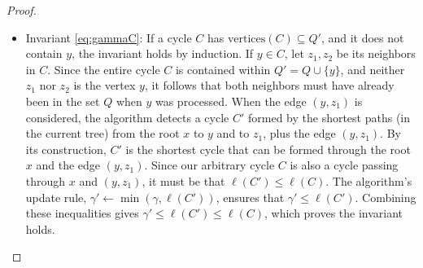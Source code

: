 \documentclass{article}
\newcommand{\ta}[1]{\textcolor{blue}{\textit{(TA: {#1})}}}
\newcommand{\hs}[1]{\textcolor{olive}{\textit{(HS: {#1})}}}
\begin{document}
\begin{proof}
\begin{itemize}
    If $y$ is a vertex in cycle $C$, let $z_1$ and $z_2$ be its neighbors within that cycle. Since the entire cycle $C$ is contained within $Q' = Q \cup \{y\}$, and neither $z_1$ nor $z_2$ is the vertex $y$, it follows that both neighbors must have already been in the set $Q$ when $y$ was processed.
    When the edge $(y, z_1)$ is considered in Line \ref{line:cycle_check}, the algorithm finds the LCA $p$ and calculates a cycle length. Let the cycle formed by the paths $x \leadsto p \leadsto y$ and $x \leadsto p \leadsto z_1$ plus edge $(y,z_1)$ be $C'$. Its length is $\delta(y) + \delta(z_1) + w(y, z_1) - 2\delta(p)$. The update rule $\gamma' \leftarrow \min(\gamma, \ell(C'))$ ensures $\gamma' \le \ell(C')$. While $C'$ might not be $C$, the argument extends to show that $\gamma$ eventually bounds the length of any cycle fully within $Q$. The explicit calculation using $\delta(y) + \delta(z) + w(y,z)$ in Line \ref{line:cycle_length_calc} of the pseudocode directly calculates the length of the cycle formed by the path $x \leadsto y$, edge $(y,z)$, and path $z \leadsto x$ found so far. The proof relates this calculation to $\ell(C)$ through the properties of shortest paths and LCAs. \ta{I didn't get the above argument}\hs{here is another attempt, but please feel free to rewrite}
    \item Invariant \eqref{eq:gammaC}: If a cycle $C$ has $\text{vertices}(C) \subseteq Q'$, and it does not contain $y$, the invariant holds by induction. If $y \in C$, let $z_1, z_2$ be its neighbors in $C$. Since the entire cycle $C$ is contained within $Q' = Q \cup \{y\}$, and neither $z_1$ nor $z_2$ is the vertex $y$, it follows that both neighbors must have already been in the set $Q$ when $y$ was processed.
    When the edge $(y, z_1)$ is considered, the algorithm detects a cycle $C'$ formed by the shortest paths (in the current tree) from the root $x$ to $y$ and to $z_1$, plus the edge $(y, z_1)$. By its construction, $C'$ is the shortest cycle that can be formed through the root $x$ and the edge $(y,z_1)$. Since our arbitrary cycle $C$ is also a cycle passing through $x$ and $(y, z_1)$, it must be that $\ell(C') \le \ell(C)$.
    The algorithm's update rule, $\gamma' \leftarrow \min(\gamma, \ell(C'))$, ensures that $\gamma' \le \ell(C')$. Combining these inequalities gives $\gamma' \le \ell(C') \le \ell(C)$, which proves the invariant holds.

\end{itemize}
\end{proof}
\end{document}
